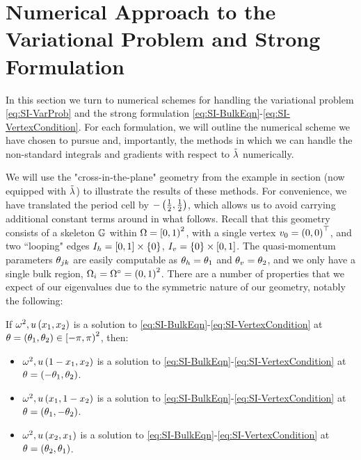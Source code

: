 \section{Numerical Approach to the Variational Problem and Strong Formulation} \label{sec:SI-VPandFDM}

In this section we turn to numerical schemes for handling the variational problem \eqref{eq:SI-VarProb} and the strong formulation \eqref{eq:SI-BulkEqn}-\eqref{eq:SI-VertexCondition}.
For each formulation, we will outline the numerical scheme we have chosen to pursue and, importantly, the methods in which we can handle the non-standard integrals and gradients with respect to $\tilde{\lambda}$ numerically.

We will use the "cross-in-the-plane" geometry from the example in section  (now equipped with $\tilde{\lambda}$) to illustrate the results of these methods.
For convenience, we have translated the period cell by $-\left( \frac{1}{2},\frac{1}{2} \right)$, which allows us to avoid carrying additional constant terms around in what follows.
Recall that this geometry consists of a skeleton $\mathbb{G}$ within $\Omega=\left[0,1\right)^2$, with a single vertex $v_0=\left( 0,0 \right)^\top$, and two ``looping" edges $I_h = \left[ 0,1 \right]\times\left\{ 0 \right\}$, $I_v=\left\{ 0 \right\}\times\left[ 0,1 \right]$.
The quasi-momentum parameters $\theta_{jk}$ are easily computable as $\theta_h = \theta_1$ and $\theta_v = \theta_2$, and we only have a single bulk region, $\Omega_i = \Omega^{\circ}=\left( 0,1 \right)^2$.
There are a number of properties that we expect of our eigenvalues due to the symmetric nature of our geometry, notably the following:
\begin{prop} \label{prop:CrossInPlaneSymmetries}
	If $\omega^2, u\left( x_1,x_2 \right)$ is a solution to \eqref{eq:SI-BulkEqn}-\eqref{eq:SI-VertexCondition} at $\theta = \left( \theta_1,\theta_2 \right)\in\left[-\pi,\pi\right)^2$, then:
	\begin{itemize}
		\item $\omega^2, u\left( 1-x_1,x_2 \right)$ is a solution to \eqref{eq:SI-BulkEqn}-\eqref{eq:SI-VertexCondition} at $\theta = \left( -\theta_1, \theta_2 \right)$.
		\item $\omega^2, u\left( x_1,1-x_2 \right)$ is a solution to \eqref{eq:SI-BulkEqn}-\eqref{eq:SI-VertexCondition} at $\theta = \left( \theta_1, -\theta_2 \right)$.
		\item $\omega^2, u\left( x_2,x_1 \right)$ is a solution to \eqref{eq:SI-BulkEqn}-\eqref{eq:SI-VertexCondition} at $\theta = \left( \theta_2, \theta_1 \right)$.
	\end{itemize}
\end{prop}

